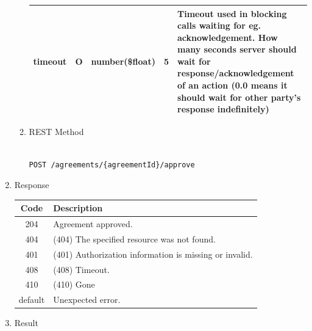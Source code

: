 \begin{enumerate}
\begin{enumerate}
\begin{table}[H]
\begin{center}
\begin{tabular}{|p{3cm}|l|p{3cm}|p{3cm}|p{4cm}|}
timeout			& O & 	number(\$float)		&	5 	&  Timeout used in blocking calls waiting for eg. acknowledgement. 
														How many seconds server should wait for response/acknowledgement of an action 
														(0.0 means it should wait for other party's response indefinitely) \\
\hline
\end{tabular}
\end{center}

\end{table}

\item REST Method

\begin{tcolorbox}[boxrule=0pt, frame empty]
\begin{verbatim} 

POST /agreements/{agreementId}/approve

\end{verbatim}
\end{tcolorbox}

\end{enumerate}

\item Response

\begin{table}[H]
\footnotesize

\begin{center}
\begin{tabular}{|c|l|} 
\hline
\rowcolor{lightgray}	Code 		& 	Description \\
\hline
204	 		&	Agreement approved. \\
\hline
404			&	(404) The specified resource was not found. \\
\hline
401			&	(401) Authorization information is missing or invalid. \\
\hline
408			&	(408) Timeout. \\
\hline
410			&	(410) Gone \\
\hline
default		&	Unexpected error. \\
\hline
\end{tabular}
\end{center}

\end{table}

\item Result

\begin{tcolorbox}[boxrule=0pt, frame empty]
\begin{verbatim}


\end{verbatim}
\end{tcolorbox}
\end{enumerate}
